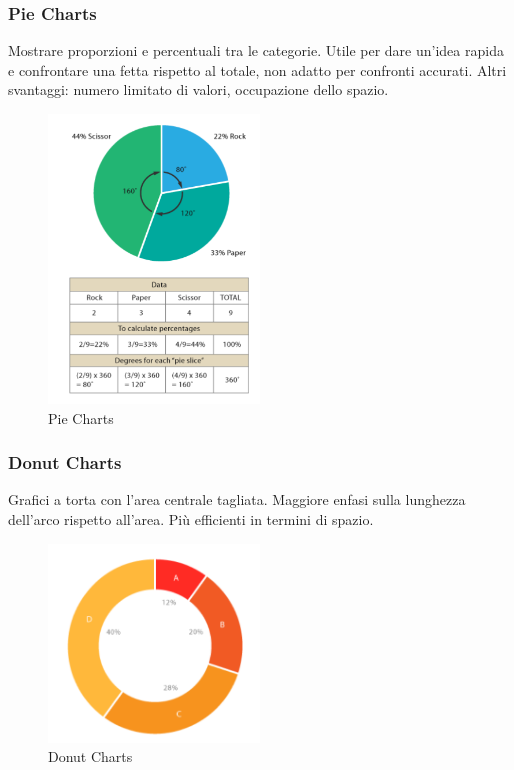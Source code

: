 \subsubsection{Pie Charts}
Mostrare proporzioni e percentuali tra le categorie. Utile per dare un'idea rapida e confrontare una fetta rispetto al totale, non adatto per confronti accurati. Altri svantaggi: numero limitato di valori, 
occupazione dello spazio.
\begin{figure}[H]
    \centering
    \includegraphics[width=0.5\textwidth]{images/PieChart.png} 
    \caption{Pie Charts}
    \label{fig:immagine}
\end{figure}

\subsubsection{Donut Charts}
Grafici a torta con l'area centrale tagliata. Maggiore enfasi sulla lunghezza dell'arco rispetto all'area. 
Più efficienti in termini di spazio.
\begin{figure}[H]
    \centering
    \includegraphics[width=0.5\textwidth]{images/DonutCharts.png} %
    \caption{Donut Charts}
    \label{fig:immagine}
\end{figure}
